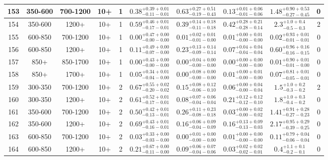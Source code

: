 \documentclass[11pt, oneside]{article}
\begin{document}
\begin{table}
{\begin{tabular}{ |c|c|c|c|c||c|c|c||c|c| }
153 & 350-600 & 700-1200 & 10+ & 1 & $0.38^{+0.39+0.01}_{-0.11-0.01}$ & $0.63^{+0.27+0.51}_{-0.19-0.43}$ & $0.13^{+0.01+0.06}_{-0.01-0.06}$ & $1.48^{+0.90+0.53}_{-0.27-0.45}$ & 0 \\ \hline
154 & 350-600 & 1200+ & 10+ & 1 & $0.59^{+0.46+0.01}_{-0.17-0.01}$ & $0.39^{+0.14+0.18}_{-0.11-0.18}$ & $0.42^{+0.28+0.21}_{-0.28-0.14}$ & $2.3^{+1.0+0.4}_{-0.5-0.3}$ & 2 \\ \hline
155 & 600-850 & 700-1200 & 10+ & 1 & $0.00^{+0.47+0.00}_{-0.00-0.00}$ & $0.01^{+0.02+0.01}_{-0.01-0.00}$ & $0.01^{+0.00+0.01}_{-0.00-0.00}$ & $0.02^{+0.93+0.01}_{-0.01-0.01}$ & 0 \\ \hline
156 & 600-850 & 1200+ & 10+ & 1 & $0.11^{+0.49+0.00}_{-0.07-0.00}$ & $0.23^{+0.13+0.14}_{-0.09-0.14}$ & $0.07^{+0.04+0.04}_{-0.04-0.04}$ & $0.60^{+0.96+0.16}_{-0.16-0.15}$ & 0 \\ \hline
157 & 850+ & 850-1700 & 10+ & 1 & $0.00^{+0.43+0.00}_{-0.00-0.00}$ & $0.00^{+0.04+0.00}_{-0.00-0.00}$ & $0.00^{+0.00+0.00}_{-0.00-0.00}$ & $0.01^{+0.90+0.01}_{-0.01-0.00}$ & 0 \\ \hline
158 & 850+ & 1700+ & 10+ & 1 & $0.05^{+0.34+0.01}_{-0.04-0.00}$ & $0.00^{+0.08+0.00}_{-0.00-0.00}$ & $0.01^{+0.00+0.01}_{-0.00-0.00}$ & $0.07^{+0.81+0.01}_{-0.05-0.01}$ & 0 \\ \hline
159 & 300-350 & 700-1200 & 10+ & 2 & $0.67^{+0.55+0.02}_{-0.20-0.02}$ & $0.15^{+0.08+0.12}_{-0.06-0.10}$ & $0.06^{+0.00+0.04}_{-0.00-0.04}$ & $1.5^{+1.0+0.2}_{-0.3-0.2}$ & 2 \\ \hline
160 & 300-350 & 1200+ & 10+ & 2 & $0.61^{+0.52+0.01}_{-0.17-0.01}$ & $0.08^{+0.07+0.06}_{-0.04-0.04}$ & $0.21^{+0.12+0.12}_{-0.12-0.10}$ & $1.8^{+1.0+0.3}_{-0.4-0.2}$ & 0 \\ \hline
161 & 350-600 & 700-1200 & 10+ & 2 & $0.50^{+0.42+0.01}_{-0.13-0.01}$ & $0.26^{+0.11+0.23}_{-0.08-0.18}$ & $0.03^{+0.00+0.02}_{-0.00-0.02}$ & $1.41^{+0.91+0.28}_{-0.27-0.23}$ & 0 \\ \hline
162 & 350-600 & 1200+ & 10+ & 2 & $0.69^{+0.43+0.01}_{-0.16-0.01}$ & $0.16^{+0.06+0.09}_{-0.04-0.09}$ & $0.16^{+0.13+0.09}_{-0.13-0.03}$ & $2.17^{+0.95+0.29}_{-0.39-0.25}$ & 0 \\ \hline
163 & 600-850 & 700-1200 & 10+ & 2 & $0.03^{+0.33+0.00}_{-0.03-0.00}$ & $0.00^{+0.01+0.00}_{-0.00-0.00}$ & $0.01^{+0.00+0.00}_{-0.00-0.00}$ & $0.11^{+0.79+0.04}_{-0.06-0.04}$ & 0 \\ \hline
164 & 600-850 & 1200+ & 10+ & 2 & $0.21^{+0.67+0.00}_{-0.11-0.00}$ & $0.09^{+0.06+0.07}_{-0.04-0.06}$ & $0.03^{+0.02+0.02}_{-0.02-0.01}$ & $0.4^{+1.1+0.1}_{-0.2-0.1}$ & 0 \\ \hline

\end{tabular}}
\end{table}
\end{document}
